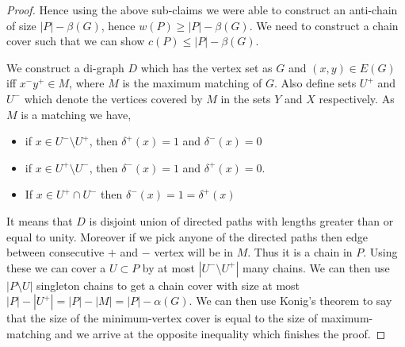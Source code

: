 \documentclass{article}
\numberwithin{equation}{section}
\newcommand{\card}[1]{\left|#1\right|}
\begin{document}
\begin{proof}
    Hence using the above sub-claims we were able to construct an anti-chain of size $\card{P} - \beta(G)$, hence $w(P) \ge \card{P} - \beta(G)$. We need to construct a chain cover such that we can show $c(P) \le \card{P} - \beta(G)$. 

    We construct a di-graph $D$ which has the vertex set as $G$ and $(x, y) \in E(G)$ iff $x^-y^+ \in M$, where $M$ is the maximum matching of $G$. Also define sets $U^+$ and $U^-$ which denote the vertices covered by $M$ in the sets $Y$ and $X$ respectively. As $M$ is a matching we have, 
    \begin{itemize}
        \item if $x \in U^-\setminus U^+$, then $\delta^+(x) =1$ and $\delta^-(x) = 0$
        \item if $x \in U^+\setminus U^-$, then $\delta^-(x) =1$ and $\delta^+(x) = 0$. 
        \item If $x \in U^+ \cap U^-$ then $\delta^-(x) =1 = \delta^+(x)$
    \end{itemize}
    It means that $D$ is disjoint union of directed paths with lengths greater than or equal to unity. Moreover if we pick anyone of the directed paths then edge between consecutive $+$ and $-$ vertex will be in $M$. Thus it is a chain in $P$. Using these we can cover a $U\subset P$ by at most $\card{U^-\setminus U^+}$ many chains. We can then use $\card{P\setminus U}$ singleton chains to get a chain cover with size at most $\card{P} - \card{U^+} = \card{P}-\card{M} = \card{P} - \alpha(G)$. We can then use Konig's theorem to say that the size of the minimum-vertex cover is equal to the size of maximum-matching and we arrive at the opposite inequality which finishes the proof. 
\end{proof} 
\newpage
\end{document}
